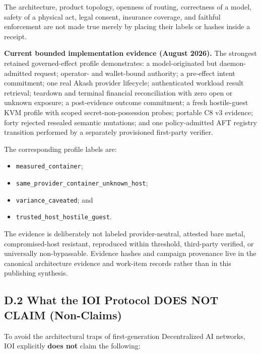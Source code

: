 \documentclass[
  11pt,
]{article}
\providecommand{\tightlist}{%
  \setlength{\itemsep}{0pt}\setlength{\parskip}{0pt}}
\begin{document}
The architecture, product topology, openness of routing, correctness of a
model, safety of a physical act, legal consent, insurance coverage, and
faithful enforcement are not made true merely by placing their labels or
hashes inside a receipt.

\textbf{Current bounded implementation evidence (August 2026).} The strongest
retained governed-effect profile demonstrates: a model-originated but
daemon-admitted request; operator- and wallet-bound authority; a pre-effect
intent commitment; one real Akash provider lifecycle; authenticated workload
result retrieval; teardown and terminal financial reconciliation with zero
open or unknown exposure; a post-evidence outcome commitment; a fresh
hostile-guest KVM profile with scoped secret-non-possession probes; portable C8
v3 evidence; forty rejected resealed semantic mutations; and one
policy-admitted AFT registry transition performed by a separately provisioned
first-party verifier.

The corresponding profile labels are:

\begin{itemize}
\tightlist
\item \texttt{measured\_container};
\item \texttt{same\_provider\_container\_unknown\_host};
\item \texttt{variance\_caveated}; and
\item \texttt{trusted\_host\_hostile\_guest}.
\end{itemize}

The evidence is deliberately not
labeled provider-neutral, attested bare metal, compromised-host resistant,
reproduced within threshold, third-party verified, or universally
non-bypassable. Evidence hashes and campaign provenance live in the canonical
architecture evidence and work-item records rather than in this publishing
synthesis.

\hypertarget{d.2-what-the-ioi-protocol-does-not-claim-non-claims}{%
\subsection{D.2 What the IOI Protocol DOES NOT CLAIM
(Non-Claims)}\label{d.2-what-the-ioi-protocol-does-not-claim-non-claims}}

To avoid the architectural traps of first-generation Decentralized AI
networks, IOI explicitly \textbf{does not} claim the following:
\end{document}
